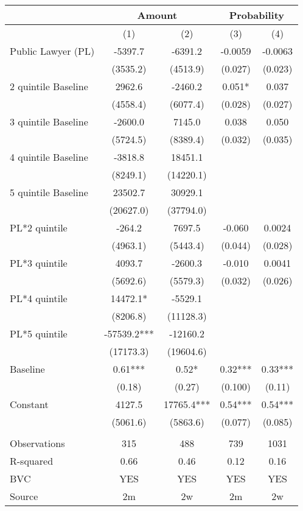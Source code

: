 \begin{tabular}{lcccc}
\toprule
      & \multicolumn{2}{c}{Amount } & \multicolumn{2}{c}{Probability} \\
\midrule
\midrule
      & (1)   & (2)   & (3)   & (4) \\
\midrule
\midrule
Public Lawyer (PL) & -5397.7 & -6391.2 & -0.0059 & -0.0063 \\
      & (3535.2) & (4513.9) & (0.027) & (0.023) \\
2 quintile Baseline & 2962.6 & -2460.2 & 0.051* & 0.037 \\
      & (4558.4) & (6077.4) & (0.028) & (0.027) \\
3 quintile Baseline & -2600.0 & 7145.0 & 0.038 & 0.050 \\
      & (5724.5) & (8389.4) & (0.032) & (0.035) \\
4 quintile  Baseline & -3818.8 & 18451.1 &       &  \\
      & (8249.1) & (14220.1) &       &  \\
5 quintile Baseline & 23502.7 & 30929.1 &       &  \\
      & (20627.0) & (37794.0) &       &  \\
PL*2 quintile  & -264.2 & 7697.5 & -0.060 & 0.0024 \\
      & (4963.1) & (5443.4) & (0.044) & (0.028) \\
PL*3 quintile & 4093.7 & -2600.3 & -0.010 & 0.0041 \\
      & (5692.6) & (5579.3) & (0.032) & (0.026) \\
PL*4 quintile    & 14472.1* & -5529.1 &       &  \\
      & (8206.8) & (11128.3) &       &  \\
PL*5 quintile & -57539.2*** & -12160.2 &       &  \\
      & (17173.3) & (19604.6) &       &  \\
Baseline & 0.61*** & 0.52* & 0.32*** & 0.33*** \\
      & (0.18) & (0.27) & (0.100) & (0.11) \\
Constant & 4127.5 & 17765.4*** & 0.54*** & 0.54*** \\
      & (5061.6) & (5863.6) & (0.077) & (0.085) \\
      &       &       &       &  \\
\midrule
Observations & 315   & 488   & 739   & 1031 \\
R-squared & 0.66  & 0.46  & 0.12  & 0.16 \\
BVC   & YES   & YES   & YES   & YES \\
Source & 2m    & 2w    & 2m    & 2w \\
\bottomrule
\bottomrule
\end{tabular}%
